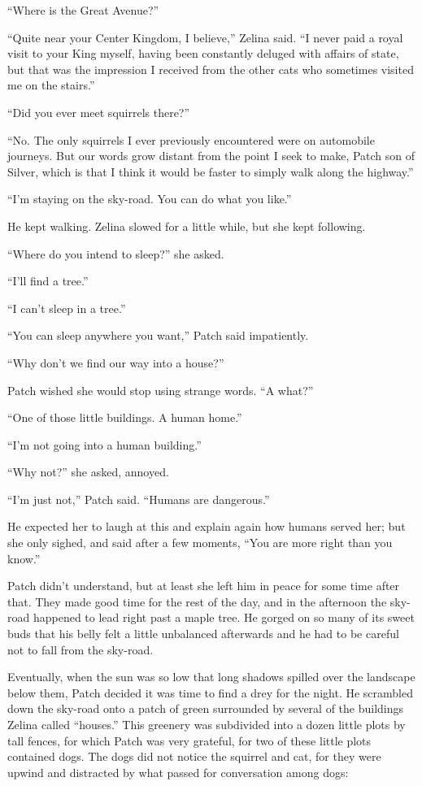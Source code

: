 \documentclass[12pt]{memoir}
\begin{document}
“Where is the Great Avenue?”

“Quite near your Center Kingdom, I believe,” Zelina said. “I never
paid a royal visit to your King myself, having been constantly deluged
with affairs of state, but that was the impression I received from the
other cats who sometimes visited me on the stairs.”

“Did you ever meet squirrels there?”

“No. The only squirrels I ever previously encountered were on
automobile journeys. But our words grow distant from the point I seek
to make, Patch son of Silver, which is that I think it would be faster
to simply walk along the highway.”

“I’m staying on the sky-road. You can do what you like.”

He kept walking. Zelina slowed for a little while, but she kept
following.

“Where do you intend to sleep?” she asked.

“I’ll find a tree.”

“I can’t sleep in a tree.”

“You can sleep anywhere you want,” Patch said impatiently.

“Why don’t we find our way into a house?”

Patch wished she would stop using strange words. “A what?”

“One of those little buildings. A human home.”

“I’m not going into a human building.”

“Why not?” she asked, annoyed.

“I’m just not,” Patch said. “Humans are dangerous.”

He expected her to laugh at this and explain again how humans served
her; but she only sighed, and said after a few moments, “You are more
right than you know.”

Patch didn’t understand, but at least she left him in peace for some
time after that. They made good time for the rest of the day, and in
the afternoon the sky-road happened to lead right past a maple
tree. He gorged on so many of its sweet buds that his belly felt a
little unbalanced afterwards and he had to be careful not to fall from
the sky-road.

Eventually, when the sun was so low that long shadows spilled over the
landscape below them, Patch decided it was time to find a drey for the
night. He scrambled down the sky-road onto a patch of green surrounded
by several of the buildings Zelina called “houses.” This greenery was
subdivided into a dozen little plots by tall fences, for which Patch
was very grateful, for two of these little plots contained dogs. The
dogs did not notice the squirrel and cat, for they were upwind and
distracted by what passed for conversation among dogs:
\end{document}
